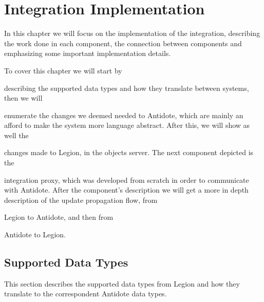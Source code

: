 \chapter{Integration Implementation}
\label{cha:integration_implementation}

In this chapter we will focus on the implementation of the integration, describing the work done in each component, the connection between components and emphasizing some important implementation details.\par
	To cover this chapter we will start by
\begin{enumerate*}[(i)]

\item describing the supported data types and how they translate between systems, then we will 

\item enumerate the changes we deemed needed to Antidote, which are mainly an afford to make the system more language abstract. After this, we will show as well the 

\item changes made to Legion, in the objects server. The next component depicted is the 

\item integration proxy, which was developed from scratch in order to communicate with Antidote. After the component's description we will get a more in depth description of the update propagation flow, from

\item Legion to Antidote, and then from

\item Antidote to Legion.

\end{enumerate*}	

\section{Supported Data Types}
\label{sec:supported_data_types}
This section describes the supported data types from Legion and how they translate to the correspondent Antidote data types.

